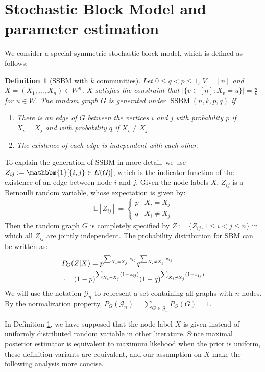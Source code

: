 \documentclass[journal]{IEEEtran}
\newtheorem{definition}{Definition}
\newcommand{\cG}{\mathcal{G}}
\newcommand{\1}{\mathbbm{1}}
\DeclareMathOperator{\SSBM}{SSBM}
\begin{document}
\section{Stochastic Block Model and parameter estimation}\label{sec:psbm}
We consider a special symmetric stochastic block model, which is defined as follows:
	\begin{definition}[SSBM with $k$ communities] \label{def:SSBM}
	Let $0\leq q<p\leq 1$, $V=[n]$ and $X=(X_1,\dots,X_n)\in W^n$. $X$ satisfies the constraint that $|\{v \in [n] : X_v = u\}| = \frac{n}{k}$ for $u\in W$.
	The random graph $G$ is generated under $\SSBM(n,k,p,q)$ if
	\begin{enumerate}
	\item There is an edge of $G$ between the vertices $i$ and $j$ with probability $p$ if $X_i=X_j$ and with probability $q$ if $X_i \neq X_j$
	\item The existence of each edge is independent with each other.
	\end{enumerate}
\end{definition}
To explain the generation of SSBM in more detail,
we use $Z_{ij}:=\mathbbm{1}[\{i,j\} \in E(G)]$, which is the indicator function of the existence of an edge between node $i$ and $j$.
Given the node labels $X$, $Z_{ij}$ is a Bernoulli random variable, whose expectation is given by:
\begin{equation}
\mathbb{E}[Z_{ij}] =
\begin{cases}
p & X_i = X_j \\ 
q & X_i \neq X_j
\end{cases}
\end{equation}
Then the random graph $G$ is completely specified by $Z:=\{Z_{ij}, 1\leq i<j\leq n\}$ in which all $Z_{ij}$ are jointly independent.
The probability distribution for SBM can be written as:
\begin{align}
&P_G(Z | X) = p^{\sum_{X_i = X_j} z_{ij}}q^{\sum_{X_i \neq X_j} z_{ij}} \notag \\
&\cdot \quad (1-p)^{\sum_{X_i = X_j} (1-z_{ij})}(1-q)^{\sum_{X_i \neq X_j} (1-z_{ij})} \label{eq:GmL}
\end{align}
We will use the notation $\cG_n$ to represent a set containing all graphs with $n$ nodes. By the normalization property,
$P_G(\cG_n) = \sum_{G\in \cG_n}P_G(G)=1$.

In Definition \ref{def:SSBM}, we have supposed that the node label $X$ is given instead of uniformly distributed random variable
in other literature. Since maximal posterior estimator is equivalent to maximum likehood when the prior is uniform,
these definition variants are equivalent, and our assumption on $X$ make the following analysis more concise.
\end{document}
